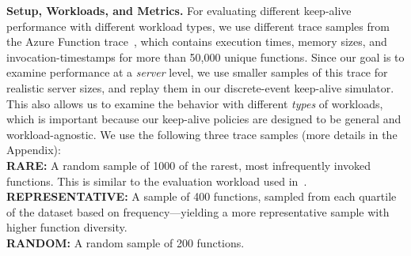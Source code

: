 \noindent \textbf{Setup, Workloads, and Metrics.}
%
For evaluating different keep-alive performance with different workload types, we use different trace samples from the Azure Function trace~\cite{shahrad_serverless_2020}, which contains execution times, memory sizes, and invocation-timestamps for more than 50,000 unique functions. 
Since our goal is to examine performance at a \emph{server} level, we use smaller samples of this trace for realistic server sizes, and replay them in our discrete-event keep-alive simulator. 
This also allows us to examine the behavior with different \emph{types} of workloads, which is important because our keep-alive policies are designed to be general and workload-agnostic.
We use the following three trace samples (more details in the Appendix): \\
\noindent \textbf{RARE:} A random sample of 1000 of the rarest, most infrequently invoked functions. This is similar to the evaluation workload used in~\cite{shahrad_serverless_2020}.  \\
\noindent \textbf{REPRESENTATIVE:} A sample of 400 functions, sampled from each quartile of the dataset based on frequency---yielding a more representative sample with higher function diversity. \\
\noindent \textbf{RANDOM:} A random sample of 200 functions. 

